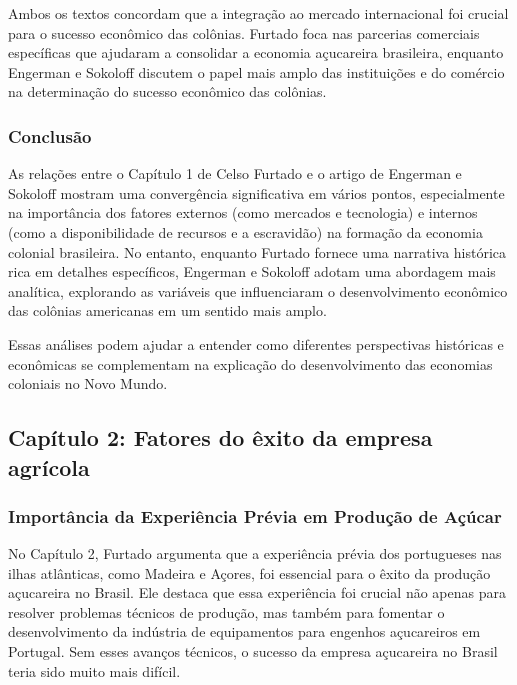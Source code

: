 \documentclass[a4paper,12pt]{article}[abntex2]
\begin{document}
Ambos os textos concordam que a integração ao mercado internacional foi crucial para o sucesso econômico das colônias. Furtado foca nas parcerias comerciais específicas que ajudaram a consolidar a economia açucareira brasileira, enquanto Engerman e Sokoloff discutem o papel mais amplo das instituições e do comércio na determinação do sucesso econômico das colônias.

\subsubsection*{Conclusão}

As relações entre o Capítulo 1 de Celso Furtado e o artigo de Engerman e Sokoloff mostram uma convergência significativa em vários pontos, especialmente na importância dos fatores externos (como mercados e tecnologia) e internos (como a disponibilidade de recursos e a escravidão) na formação da economia colonial brasileira. No entanto, enquanto Furtado fornece uma narrativa histórica rica em detalhes específicos, Engerman e Sokoloff adotam uma abordagem mais analítica, explorando as variáveis que influenciaram o desenvolvimento econômico das colônias americanas em um sentido mais amplo.

Essas análises podem ajudar a entender como diferentes perspectivas históricas e econômicas se complementam na explicação do desenvolvimento das economias coloniais no Novo Mundo.

\subsection*{\textbf{Capítulo 2: Fatores do êxito da empresa agrícola}}

\subsubsection*{Importância da Experiência Prévia em Produção de Açúcar}

No Capítulo 2, Furtado argumenta que a experiência prévia dos portugueses nas ilhas atlânticas, como Madeira e Açores, foi essencial para o êxito da produção açucareira no Brasil. Ele destaca que essa experiência foi crucial não apenas para resolver problemas técnicos de produção, mas também para fomentar o desenvolvimento da indústria de equipamentos para engenhos açucareiros em Portugal. Sem esses avanços técnicos, o sucesso da empresa açucareira no Brasil teria sido muito mais difícil.
\end{document}
